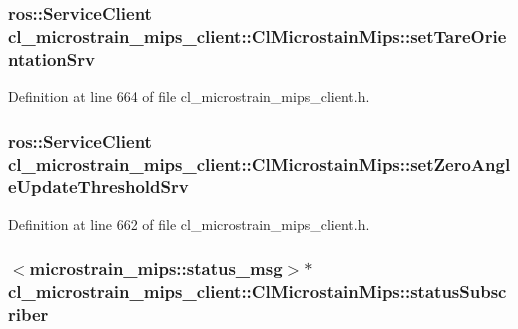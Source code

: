 \subsubsection[{\texorpdfstring{set\+Tare\+Orientation\+Srv}{setTareOrientationSrv}}]{\setlength{\rightskip}{0pt plus 5cm}ros\+::\+Service\+Client cl\+\_\+microstrain\+\_\+mips\+\_\+client\+::\+Cl\+Microstain\+Mips\+::set\+Tare\+Orientation\+Srv\hspace{0.3cm}{\ttfamily [protected]}}\hypertarget{classcl__microstrain__mips__client_1_1ClMicrostainMips_a849efd6cd110868c64ba0d1d2ad3c94f}{}\label{classcl__microstrain__mips__client_1_1ClMicrostainMips_a849efd6cd110868c64ba0d1d2ad3c94f}


Definition at line 664 of file cl\+\_\+microstrain\+\_\+mips\+\_\+client.\+h.

\subsubsection[{\texorpdfstring{set\+Zero\+Angle\+Update\+Threshold\+Srv}{setZeroAngleUpdateThresholdSrv}}]{\setlength{\rightskip}{0pt plus 5cm}ros\+::\+Service\+Client cl\+\_\+microstrain\+\_\+mips\+\_\+client\+::\+Cl\+Microstain\+Mips\+::set\+Zero\+Angle\+Update\+Threshold\+Srv\hspace{0.3cm}{\ttfamily [protected]}}\hypertarget{classcl__microstrain__mips__client_1_1ClMicrostainMips_a44d26e3c3ec005e1a8c04c40c7ef49f3}{}\label{classcl__microstrain__mips__client_1_1ClMicrostainMips_a44d26e3c3ec005e1a8c04c40c7ef49f3}


Definition at line 662 of file cl\+\_\+microstrain\+\_\+mips\+\_\+client.\+h.

\subsubsection[{\texorpdfstring{status\+Subscriber}{statusSubscriber}}]{$<$microstrain\+\_\+mips\+::status\+\_\+msg$>$$\ast$ cl\+\_\+microstrain\+\_\+mips\+\_\+client\+::\+Cl\+Microstain\+Mips\+::status\+Subscriber}\hypertarget{classcl__microstrain__mips__client_1_1ClMicrostainMips_a617ae35f250a65bf0db14571cfcae365}{}\label{classcl__microstrain__mips__client_1_1ClMicrostainMips_a617ae35f250a65bf0db14571cfcae365}


